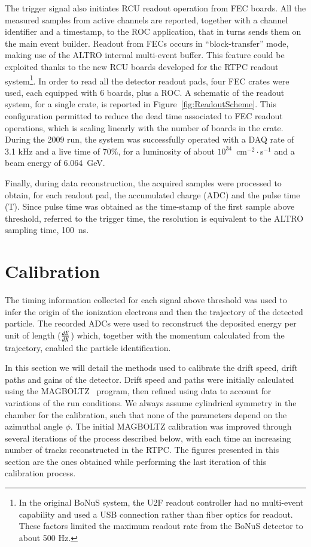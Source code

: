 \documentclass[preprint,5p]{elsarticle}
\begin{document}
The trigger signal also initiates RCU readout operation from FEC boards. All the 
measured samples from active channels are reported, together with a channel 
identifier and a timestamp, to the ROC application, that in turns sends them on 
the main event builder. Readout from FECs occurs in ``block-transfer'' mode, 
making use of the ALTRO internal multi-event buffer. This feature could be 
exploited thanks to the new RCU boards developed for the RTPC readout 
system\footnote{In the original BoNuS system, the U2F readout controller had no 
multi-event capability and used a USB connection rather than fiber optics for 
readout. These factors limited the maximum readout rate from the BoNuS detector 
to about 500 Hz.}. In order to read all the detector readout pads, four FEC 
crates were used, each equipped with 6 boards, plus a ROC. A schematic of the 
readout system, for a single crate, is reported in 
Figure~\ref{fig:ReadoutScheme}. This configuration permitted to reduce the dead 
time associated to FEC readout operations, which is scaling linearly with the 
number of boards in the crate. During the 2009 run, the system was successfully 
operated with a DAQ rate of 3.1 kHz and a live time of $70 \%$, for a 
luminosity of about $10^{34}$~cm$^{-2}\cdot$s$^{-1}$ and a beam energy of 
6.064~GeV.

Finally, during data reconstruction, the acquired samples were processed to obtain, 
for each readout pad, the accumulated charge (ADC) and the pulse time (T). Since 
pulse time was obtained as the time-stamp of the first sample above threshold, 
referred to the trigger time, the resolution is equivalent to the ALTRO 
sampling time, 100~ns.

\section{Calibration} \label{sec_calib}

The timing information collected for each signal above threshold
was used to infer the origin of the ionization electrons and 
then the trajectory of the detected particle. The recorded ADCs were used to reconstruct 
the deposited energy per unit of length ($\small{\frac{dE}{dX}}$) which, 
together with the momentum calculated from the trajectory, enabled the particle 
identification. 

In this section we will detail the methods used to calibrate the drift speed,
drift paths and gains of the detector. Drift speed and paths were initially
calculated using the MAGBOLTZ~\cite{Biagi:1999nwa} program, then refined using
data to account for variations of the run conditions. We always assume 
cylindrical symmetry in the chamber for the calibration, such that none of
the parameters depend on the azimuthal angle $\phi$. The initial MAGBOLTZ
calibration was improved through several iterations of the
process described below, with each time an increasing number of tracks 
reconstructed in the RTPC. The figures presented in this section
are the ones obtained while performing the last iteration of this
calibration process.
\end{document}
